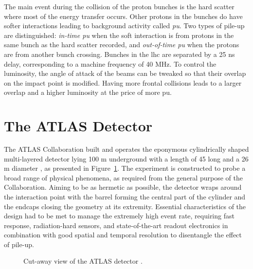 The main event during the collision of the proton bunches is the hard scatter where most of the energy transfer occurs. Other protons in the bunches do have softer interactions leading to background activity called \textit{\gls{pu}}. Two types of pile-up are distinguished: \textit{in-time \gls{pu}} when the soft interaction is from protons in the same bunch as the hard scatter recorded, and \textit{out-of-time \gls{pu}} when the protons are from another bunch crossing. Bunches in the \gls{lhc} are separated by a 25 ns delay, corresponding to a machine frequency of 40 MHz. To control the luminosity, the angle of attack of the beams can be tweaked so that their overlap on the impact point is modified. Having more frontal collisions leads to a larger overlap and a higher luminosity at the price of more \gls{pu}. 

\section{The ATLAS Detector}\label{sec-ATLASDet}
The ATLAS Collaboration built and operates the eponymous cylindrically shaped multi-layered detector lying 100 m underground with a length of 45 long and a 26 m diameter \cite{TheATLASCollaboration_2008}, as presented in Figure~\ref{fig-AtlasDec}. The experiment is constructed to probe a broad range of physical phenomena, as required from the general purpose of the Collaboration. Aiming to be as hermetic as possible, the detector wraps around the interaction point with the barrel forming the central part of the cylinder and the endcaps closing the geometry at its extremity. Essential characteristics of the design had to be met to manage the extremely high event rate, requiring fast response, radiation-hard sensors, and state-of-the-art readout electronics in combination with good spatial and temporal resolution to disentangle the effect of pile-up. 

\begin{figure}[!h]
\centering
\hspace{-1.25cm}
\caption{Cut-away view of the ATLAS detector \cite{ATLASschematics}.}
\label{fig-AtlasDec}
\end{figure}


